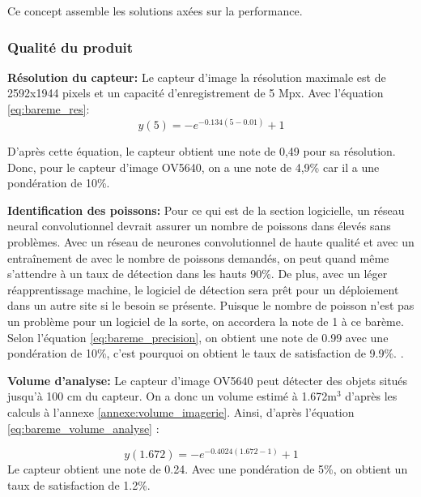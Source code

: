 Ce concept assemble les solutions axées sur la performance.

\subsubsection{Qualité du produit}



\textbf{Résolution du capteur:}
Le capteur d'image la résolution maximale est de 2592x1944 pixels et un capacité d'enregistrement de 5 Mpx. Avec l'équation \ref{eq:bareme_res}:
\begin{equation}
    y(5) = - e^{-0.134(5-0.01)}+1
\end{equation}

D'après cette équation, le capteur obtient une note de 0,49 pour sa résolution. Donc, pour le capteur d'image OV5640, on a une note de 4,9\% car il a une pondération de 10\%.
\vspace{5mm}


\textbf{Identification des poissons:}
Pour ce qui est de la section logicielle, un réseau neural convolutionnel devrait assurer un nombre de poissons dans élevés sans problèmes. Avec un réseau de neurones convolutionnel de haute qualité et avec un entraînement de avec le nombre de poissons demandés, on peut quand même s’attendre à un taux de détection dans les hauts 90\%. De plus, avec un léger réapprentissage machine, le logiciel de détection sera prêt pour un déploiement dans un autre site si le besoin se présente. Puisque le nombre de poisson n'est pas un problème pour un logiciel de la sorte, on accordera la note de 1 à ce barème. Selon l’équation \ref{eq:bareme_precision}, on obtient une note de 0.99 avec une pondération de 10\%, c’est pourquoi on obtient le taux de satisfaction de 9.9\%. \cite{neural_yt}.
\vspace{5mm}


\textbf{Volume d'analyse:}
Le capteur d'image OV5640 peut détecter des objets situés jusqu'à 100 cm du capteur. On a donc un volume estimé à 1.672m$^3$ d'après les calculs à l'annexe \ref{annexe:volume_imagerie}. Ainsi, d'après l'équation \ref{eq:bareme_volume_analyse} :

\begin{equation}
y(1.672) =-e^{-0.4024(1.672-1)}+1 
\end{equation}
Le capteur obtient une note de 0.24. Avec une pondération de 5\%, on obtient un taux de satisfaction de 1.2\%.


\vspace{5mm}

